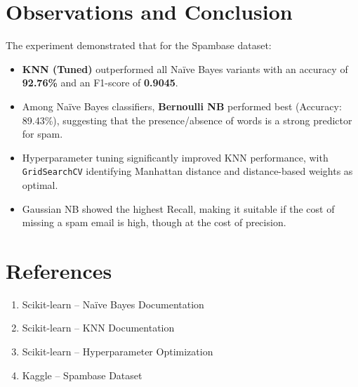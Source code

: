 \documentclass[11pt]{article}
\begin{document}
\section{Observations and Conclusion}
The experiment demonstrated that for the Spambase dataset:
\begin{itemize}
    \item \textbf{KNN (Tuned)} outperformed all Naïve Bayes variants with an accuracy of \textbf{92.76\%} and an F1-score of \textbf{0.9045}.
    \item Among Naïve Bayes classifiers, \textbf{Bernoulli NB} performed best (Accuracy: 89.43\%), suggesting that the presence/absence of words is a strong predictor for spam.
    \item Hyperparameter tuning significantly improved KNN performance, with \texttt{GridSearchCV} identifying Manhattan distance and distance-based weights as optimal.
    \item Gaussian NB showed the highest Recall, making it suitable if the cost of missing a spam email is high, though at the cost of precision.
\end{itemize}

\section{References}
\begin{enumerate}
    \item Scikit-learn -- Naïve Bayes Documentation
    \item Scikit-learn -- KNN Documentation
    \item Scikit-learn -- Hyperparameter Optimization
    \item Kaggle -- Spambase Dataset
\end{enumerate}
\end{document}
